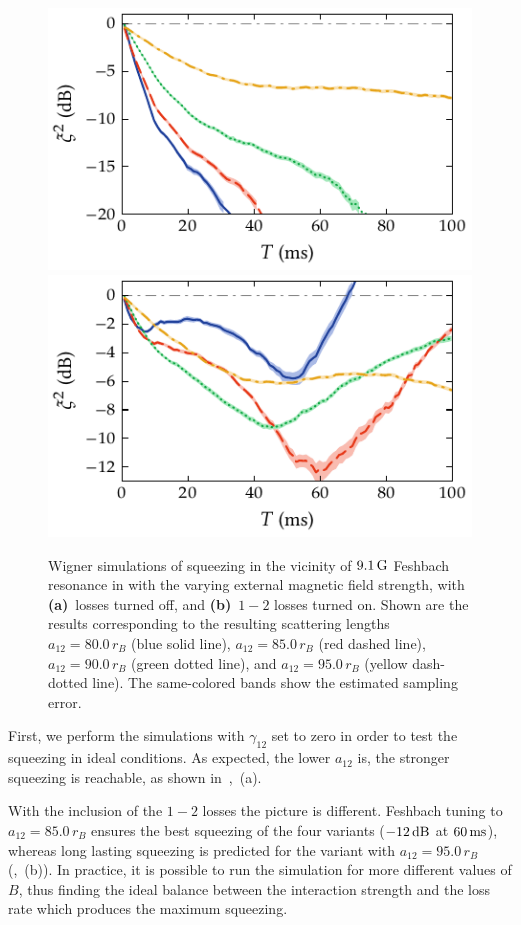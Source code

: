 \begin{figure}
    \centerline{%
    \includegraphics{figures_generated/bec_squeezing/feshbach_squeezing_no_losses.pdf}%
    \includegraphics{figures_generated/bec_squeezing/feshbach_squeezing.pdf}}

    \caption{
    Wigner simulations of squeezing in the vicinity of $9.1\mbox{\ensuremath{\,\mathrm{G}}}$ Feshbach resonance in \Rb{} with the varying external magnetic field strength, with \textbf{(a)}~losses turned off, and \textbf{(b)}~$1-2$ losses turned on.
    Shown are the results corresponding to the resulting scattering lengths $a_{12}=80.0\,r_B$ (blue solid line), $a_{12}=85.0\,r_B$ (red dashed line), $a_{12}=90.0\,r_B$ (green dotted line), and $a_{12}=95.0\,r_B$ (yellow dash-dotted line).
    The same-colored bands show the estimated sampling error.}

    \label{fig:bec-squeezing:feshbach:squeezing}
\end{figure}

First, we perform the simulations with $\gamma_{12}$ set to zero in order to test the squeezing in ideal conditions.
As expected, the lower $a_{12}$ is, the stronger squeezing is reachable, as shown in~,~(a).

With the inclusion of the $1-2$ losses the picture is different.
Feshbach tuning to $a_{12} = 85.0\,r_B$ ensures the best squeezing of the four variants ($-12\mbox{\ensuremath{\,\mathrm{dB}}}$ at $60\mbox{\ensuremath{\,\mathrm{ms}}}$), whereas long lasting squeezing is predicted for the variant with $a_{12} = 95.0\,r_B$ (,~(b)).
In practice, it is possible to run the simulation for more different values of $B$, thus finding the ideal balance between the interaction strength and the loss rate which produces the maximum squeezing.
